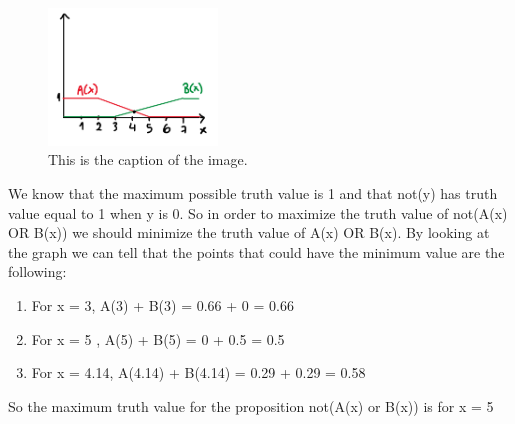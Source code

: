 \documentclass{article}
\begin{document}
\begin{figure}[h]
    \centering
    \includegraphics[width=0.4\textwidth]{pr12.png}
    \caption{This is the caption of the image.}
    
\end{figure}

\noindent \newline We know that the maximum possible truth value is 1 and that not(y) has truth value equal to 1 when y is 0. So in order to 
maximize the truth value of not(A(x) OR B(x)) we should minimize the truth value of A(x) OR B(x). By looking at the graph we can tell that the points that could have the minimum value are the following: \\
\begin{enumerate}
  \item For x = 3, A(3) + B(3) = 0.66 + 0 = 0.66
  \item For x = 5 , A(5) + B(5) = 0 + 0.5 = 0.5
  \item For x = 4.14, A(4.14) + B(4.14) = 0.29 + 0.29 = 0.58
\end{enumerate}
So the maximum truth value for the proposition not(A(x) or B(x)) is for x = 5
\end{document}
